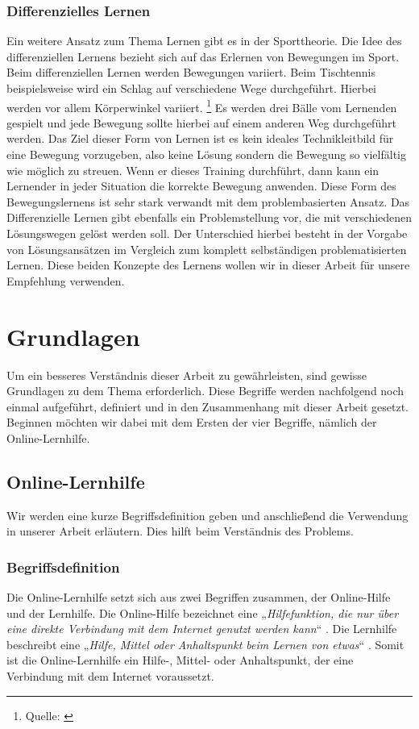 \subsection{Differenzielles Lernen}
Ein weitere Ansatz zum Thema Lernen gibt es in der Sporttheorie. Die Idee des differenziellen Lernens bezieht sich auf das Erlernen von Bewegungen im Sport. Beim differenziellen Lernen werden Bewegungen variiert. Beim Tischtennis beispielsweise wird ein Schlag auf verschiedene Wege durchgeführt. Hierbei werden vor allem Körperwinkel variiert. \footnote{Quelle: \cite{differenziellesLernen}} Es werden drei Bälle vom Lernenden gespielt und jede Bewegung sollte hierbei auf einem anderen Weg durchgeführt werden. Das Ziel dieser Form von Lernen ist es kein ideales Technikleitbild für eine Bewegung vorzugeben, also keine Lösung sondern die Bewegung so vielfältig wie möglich zu streuen. Wenn er dieses Training durchführt, dann kann ein Lernender in jeder Situation die korrekte Bewegung anwenden. Diese Form des Bewegungslernens ist sehr stark verwandt mit dem problembasierten Ansatz. Das Differenzielle Lernen gibt ebenfalls ein Problemstellung vor, die mit verschiedenen Lösungswegen gelöst werden soll. Der Unterschied hierbei besteht in der Vorgabe von Lösungsansätzen im Vergleich zum komplett selbständigen problematisierten Lernen.  Diese beiden Konzepte des Lernens wollen wir in dieser Arbeit für unsere Empfehlung verwenden.


\chapter{Grundlagen}
Um ein besseres Verständnis dieser Arbeit zu gewährleisten, sind gewisse Grundlagen zu dem Thema erforderlich. Diese Begriffe werden nachfolgend noch einmal aufgeführt, definiert und in den Zusammenhang mit dieser Arbeit gesetzt. Beginnen möchten wir dabei mit dem Ersten der vier Begriffe, nämlich der Online-Lernhilfe.
\section{Online-Lernhilfe}
Wir werden eine kurze Begriffsdefinition geben und anschließend die Verwendung in unserer Arbeit erläutern. Dies hilft beim Verständnis des Problems.
\subsection{Begriffsdefinition}
Die Online-Lernhilfe setzt sich aus zwei Begriffen zusammen, der Online-Hilfe und der Lernhilfe. Die Online-Hilfe bezeichnet eine „\textit{Hilfefunktion, die nur über eine direkte Verbindung mit dem Internet genutzt werden kann}“ \cite{dud1}. Die Lernhilfe beschreibt eine „\textit{Hilfe, Mittel oder Anhaltspunkt beim Lernen von etwas}“ \cite{dud2}. Somit ist die Online-Lernhilfe ein Hilfe-, Mittel- oder Anhaltspunkt, der eine Verbindung mit dem Internet voraussetzt.


